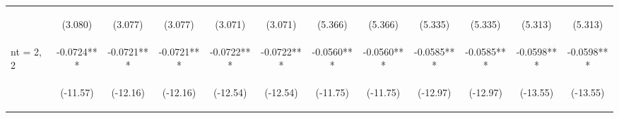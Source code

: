 \documentclass[]{article}
\begin{document}
\begin{center}
\begin{tabular}{lccccccccccc}
\vspace{4pt} & \begin{footnotesize}(3.080)\end{footnotesize} & \begin{footnotesize}(3.077)\end{footnotesize} & \begin{footnotesize}(3.077)\end{footnotesize} & \begin{footnotesize}(3.071)\end{footnotesize} & \begin{footnotesize}(3.071)\end{footnotesize} & \begin{footnotesize}(5.366)\end{footnotesize} & \begin{footnotesize}(5.366)\end{footnotesize} & \begin{footnotesize}(5.335)\end{footnotesize} & \begin{footnotesize}(5.335)\end{footnotesize} & \begin{footnotesize}(5.313)\end{footnotesize} & \begin{footnotesize}(5.313)\end{footnotesize} \\
nt = 2, 2 & -0.0724*** & -0.0721*** & -0.0721*** & -0.0722*** & -0.0722*** & -0.0560*** & -0.0560*** & -0.0585*** & -0.0585*** & -0.0598*** & -0.0598*** \\
\vspace{4pt} & \begin{footnotesize}(-11.57)\end{footnotesize} & \begin{footnotesize}(-12.16)\end{footnotesize} & \begin{footnotesize}(-12.16)\end{footnotesize} & \begin{footnotesize}(-12.54)\end{footnotesize} & \begin{footnotesize}(-12.54)\end{footnotesize} & \begin{footnotesize}(-11.75)\end{footnotesize} & \begin{footnotesize}(-11.75)\end{footnotesize} & \begin{footnotesize}(-12.97)\end{footnotesize} & \begin{footnotesize}(-12.97)\end{footnotesize} & \begin{footnotesize}(-13.55)\end{footnotesize} & \begin{footnotesize}(-13.55)\end{footnotesize} \\

\end{tabular}
\end{center}
\end{document}
